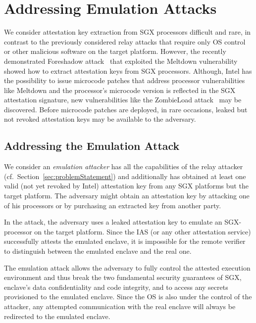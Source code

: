 \section{Addressing Emulation Attacks}
\label{sec:variantII}

We consider attestation key extraction from SGX processors difficult and rare, in contrast to the previously considered relay attacks that require only OS control or other malicious software on the target platform. However, the recently demonstrated Foreshadow attack~\cite{foreshadow-usenix18} that exploited the Meltdown vulnerability~\cite{Lipp2018meltdown} showed how to extract attestation keys from SGX processors. Although, Intel has the possibility to issue microcode patches that address processor vulnerabilities like Meltdown and the processor's microcode version is reflected in the SGX attestation signature, new vulnerabilities like the ZombieLoad attack~\cite{ZombieLoad} may be discovered. Before microcode patches are deployed, in rare occasions, leaked but not revoked attestation keys may be available to the adversary.


\subsection{Addressing the Emulation Attack} 

We consider an \emph{emulation attacker} has all the capabilities of the relay attacker (cf.\ Section~\ref{sec:problemStatement}) and additionally has obtained at least one valid (not yet revoked by Intel) attestation key from any SGX platforms but the target platform. The adversary might obtain an attestation key by attacking one of his processors or by purchasing an extracted key from another party. 

In the attack, the adversary uses a leaked attestation key to emulate an SGX-processor on the target platform. Since the IAS (or any other attestation service) successfully attests the emulated enclave, it is impossible for the remote verifier to distinguish between the emulated enclave and the real one. 


The emulation attack allows the adversary to fully control the attested execution environment and thus break the two fundamental security guarantees of SGX, enclave's data confidentiality and code integrity, and to access any secrets provisioned to the emulated enclave. Since the OS is also under the control of the attacker, any attempted communication with the real enclave will always be redirected to the emulated enclave.



